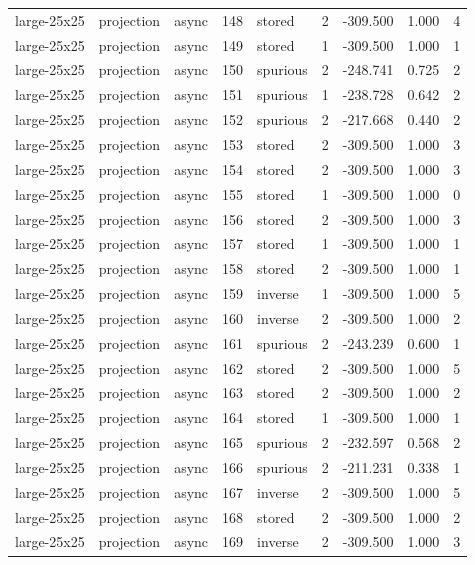 \begin{tabular}{lllrlrrrr}
large-25x25 & projection & async & 148 & stored & 2 & -309.500 & 1.000 & 4 \\
large-25x25 & projection & async & 149 & stored & 1 & -309.500 & 1.000 & 1 \\
large-25x25 & projection & async & 150 & spurious & 2 & -248.741 & 0.725 & 2 \\
large-25x25 & projection & async & 151 & spurious & 1 & -238.728 & 0.642 & 2 \\
large-25x25 & projection & async & 152 & spurious & 2 & -217.668 & 0.440 & 2 \\
large-25x25 & projection & async & 153 & stored & 2 & -309.500 & 1.000 & 3 \\
large-25x25 & projection & async & 154 & stored & 2 & -309.500 & 1.000 & 3 \\
large-25x25 & projection & async & 155 & stored & 1 & -309.500 & 1.000 & 0 \\
large-25x25 & projection & async & 156 & stored & 2 & -309.500 & 1.000 & 3 \\
large-25x25 & projection & async & 157 & stored & 1 & -309.500 & 1.000 & 1 \\
large-25x25 & projection & async & 158 & stored & 2 & -309.500 & 1.000 & 1 \\
large-25x25 & projection & async & 159 & inverse & 1 & -309.500 & 1.000 & 5 \\
large-25x25 & projection & async & 160 & inverse & 2 & -309.500 & 1.000 & 2 \\
large-25x25 & projection & async & 161 & spurious & 2 & -243.239 & 0.600 & 1 \\
large-25x25 & projection & async & 162 & stored & 2 & -309.500 & 1.000 & 5 \\
large-25x25 & projection & async & 163 & stored & 2 & -309.500 & 1.000 & 2 \\
large-25x25 & projection & async & 164 & stored & 1 & -309.500 & 1.000 & 1 \\
large-25x25 & projection & async & 165 & spurious & 2 & -232.597 & 0.568 & 2 \\
large-25x25 & projection & async & 166 & spurious & 2 & -211.231 & 0.338 & 1 \\
large-25x25 & projection & async & 167 & inverse & 2 & -309.500 & 1.000 & 5 \\
large-25x25 & projection & async & 168 & stored & 2 & -309.500 & 1.000 & 2 \\
large-25x25 & projection & async & 169 & inverse & 2 & -309.500 & 1.000 & 3 \\

\end{tabular}
